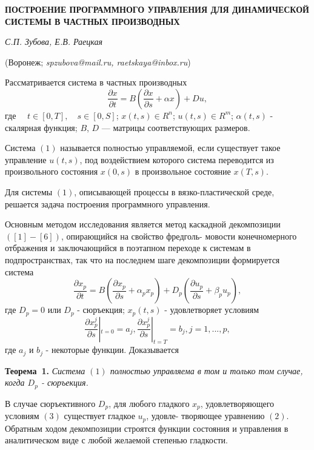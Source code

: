 \begin{center}
    {\bf ПОСТРОЕНИЕ ПРОГРАММНОГО УПРАВЛЕНИЯ ДЛЯ ДИНАМИЧЕСКОЙ СИСТЕМЫ В ЧАСТНЫХ ПРОИЗВОДНЫХ}

    {\it С.П. Зубова, Е.В. Раецкая}

    (Воронеж; {\it spzubova@mail.ru, \it raetskaya@inbox.ru})

\end{center}


 Рассматривается система в частных производных
\begin{equation}
\frac{\partial x}{\partial t}=B(\frac{\partial x}{\partial s}+ \alpha x) + Du,
\end{equation}
 где $\quad t\in [0,T],\quad s\in [0,S]$; $x(t,s)\in R ^{n}$; $u(t,s)\in R^{m}$; $\alpha(t,s)$ - скалярная функция; $B$, $D$ --- матрицы соответствующих размеров.

Система $(1)$ называется полностью управляемой, если существует такое управление $u(t,s)$,
под воздействием которого система переводится  из произвольного состояния $x(0,s)$ в произвольное состояние $x(T,s)$.

Для системы $(1)$, описывающей процессы в вязко-пластической среде, решается задача построения программного управления.


Основным методом исследования является метод каскадной декомпозиции $([1]-[6])$, опирающийся на свойство фредголь-
мовости конечномерного отбражения и заключающийся в поэтапном переходе к системам в подпространствах, так что на
последнем шаге декомпозиции формируется система
\begin{equation}
\frac{\partial x_{p}}{\partial t}=B(\frac{\partial x_{p}}{\partial s}+ \alpha_{p} x_{p}) + D_{p}(\frac{\partial u_{p}}{\partial s}+ \beta_{p} u_{p}),
\end{equation}
где $D_{p}=0$ или $D_{p}$ - сюръекция; $x_{p}(t,s)$ - удовлетворяет условиям
\begin{equation}
\frac{\partial x^{j}_{p}}{\partial s}|_{t=0} = a_{j}, \frac{\partial x^{j}_{p}}{\partial s}|_{t=T} = b_{j}, j=1,...,p,
\end{equation}
где $a_{j}$ и $b_{j}$ - некоторые функции. Доказывается

\textbf{Теорема~1.} {\it Система $(1)$ полностью управляема в том и только том случае, когда $D_{p}$ - сюръекция.}


В случае сюръективного $D_{p}$, для любого гладкого $x_{p}$, удовлетворяющего
условиям $(3)$ существует гладкое $u_{p}$, удовле-
творяющее уравнению $(2)$. Обратным ходом декомпозиции строятся функции состояния
и управления в аналитическом виде  с любой желаемой степенью гладкости.

